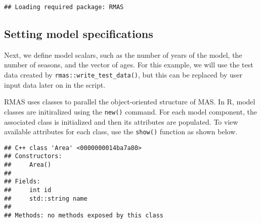 \documentclass[
]{article}
\newenvironment{Shaded}{\begin{snugshade}}{\end{snugshade}}
\newcommand{\CommentTok}[1]{\textcolor[rgb]{0.56,0.35,0.01}{\textit{#1}}}
\newcommand{\DataTypeTok}[1]{\textcolor[rgb]{0.13,0.29,0.53}{#1}}
\newcommand{\KeywordTok}[1]{\textcolor[rgb]{0.13,0.29,0.53}{\textbf{#1}}}
\newcommand{\NormalTok}[1]{#1}
\newcommand{\OperatorTok}[1]{\textcolor[rgb]{0.81,0.36,0.00}{\textbf{#1}}}
\newcommand{\StringTok}[1]{\textcolor[rgb]{0.31,0.60,0.02}{#1}}
\begin{document}
\begin{verbatim}
## Loading required package: RMAS
\end{verbatim}

\begin{Shaded}
\end{Shaded}

\hypertarget{setting-model-specifications}{%
\subsection{Setting model
specifications}\label{setting-model-specifications}}

Next, we define model scalars, such as the number of years of the model,
the number of seasons, and the vector of ages. For this example, we will
use the test data created by \texttt{rmas::write\_test\_data()}, but
this can be replaced by user input data later on in the script.

RMAS uses classes to parallel the object-oriented structure of MAS. In
R, model classes are initiralized using the \texttt{new()} command. For
each model component, the associated class is initialized and then its
attributes are populated. To view available attributes for each class,
use the \texttt{show()} function as shown below.

\begin{Shaded}
\end{Shaded}

\begin{verbatim}
## C++ class 'Area' <0000000014ba7a80>
## Constructors:
##     Area()
## 
## Fields: 
##     int id
##     std::string name
## 
## Methods: no methods exposed by this class
\end{verbatim}

\begin{Shaded}
\end{Shaded}
\end{document}
